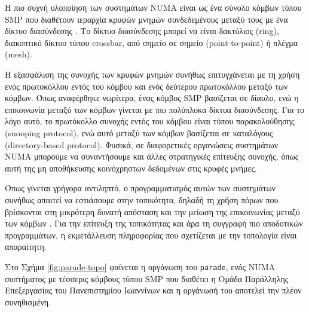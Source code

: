 Η πιο συχνή υλοποίηση των συστημάτων NUMA είναι ως ένα σύνολο κόμβων τύπου SMP που διαθέτουν ιεραρχία κρυφών μνημών συνδεδεμένους μεταξύ τους με ένα δίκτυο διασύνδεσης \cite{dobson2003linux}. Το δίκτυο διασύνδεσης μπορεί να είναι δακτύλιος (ring), διακοπτικό δίκτυο τύπου crossbar, από σημείο σε σημείο (point-to-point) ή πλέγμα (mesh).

Η εξασφάλιση της συνοχής των κρυφών μνημών συνήθως επιτυγχάνεται με τη χρήση ενός πρωτοκόλλου εντός του κόμβου και ενός δεύτερου πρωτοκόλλου μεταξύ των κόμβων. Όπως αναφέρθηκε νωρίτερα, ένας κόμβος SMP βασίζεται σε δίαυλο, ενώ η επικοινωνία μεταξύ των κόμβων γίνεται με πιο πολύπλοκα δίκτυα διασύνδεσης. Για το λόγο αυτό, το πρωτόκολλο συνοχής εντός του κόμβου είναι τύπου παρακολούθησης (snooping protocol), ενώ αυτό μεταξύ των κόμβων βασίζεται σε καταλόγους (directory-based protocol). Φυσικά, σε διαφορετικές οργανώσεις συστημάτων NUMA μπορούμε να συναντήσουμε και άλλες στρατηγικές επίτευξης συνοχής, όπως αυτή της μη αποθήκευσης κοινόχρηστων δεδομένων στις κρυφές μνήμες.

Όπως γίνεται γρήγορα αντιληπτό, ο προγραμματισμός αυτών των συστημάτων συνήθως απαιτεί να εστιάσουμε στην τοπικότητα, δηλαδή τη χρήση πόρων που βρίσκονται στη μικρότερη δυνατή απόσταση και την μείωση της επικοινωνίας μεταξύ των κόμβων \cite{bligh2004linux}. Για την επίτευξη της τοπικότητας και άρα τη συγγραφή πιο αποδοτικών προγραμμάτων, η εκμετάλλευση πληροφορίας που σχετίζεται με την τοπολογία είναι απαραίτητη.


Στο Σχήμα \ref{fig:parade-topo} φαίνεται η οργάνωση του \texttt{parade}, ενός NUMA συστήματος με τέσσερις κόμβους τύπου SMP που διαθέτει η Ομάδα Παράλληλης Επεξεργασίας του Πανεπιστημίου Ιωαννίνων και η οργάνωσή του αποτελεί την πλέον συνηθισμένη.

